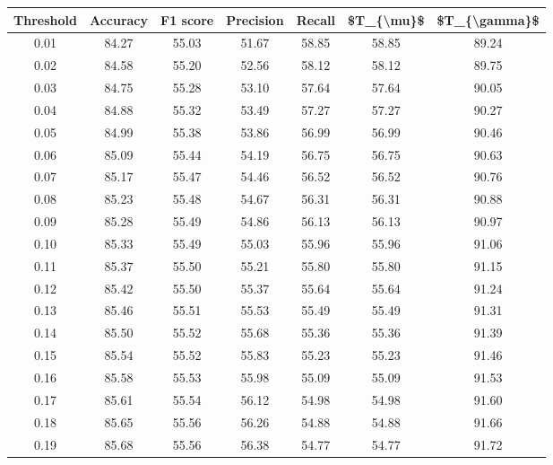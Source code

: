 \begin{tabular}{|c|c|c|c|c|c|c|}
\hline
 Threshold &  Accuracy &  F1 score &  Precision &  Recall &  \$T\_\{\textbackslash mu\}\$ &  \$T\_\{\textbackslash gamma\}\$ \\
\hline
      0.01 &     84.27 &     55.03 &      51.67 &   58.85 &      58.85 &         89.24 \\
      0.02 &     84.58 &     55.20 &      52.56 &   58.12 &      58.12 &         89.75 \\
      0.03 &     84.75 &     55.28 &      53.10 &   57.64 &      57.64 &         90.05 \\
      0.04 &     84.88 &     55.32 &      53.49 &   57.27 &      57.27 &         90.27 \\
      0.05 &     84.99 &     55.38 &      53.86 &   56.99 &      56.99 &         90.46 \\
      0.06 &     85.09 &     55.44 &      54.19 &   56.75 &      56.75 &         90.63 \\
      0.07 &     85.17 &     55.47 &      54.46 &   56.52 &      56.52 &         90.76 \\
      0.08 &     85.23 &     55.48 &      54.67 &   56.31 &      56.31 &         90.88 \\
      0.09 &     85.28 &     55.49 &      54.86 &   56.13 &      56.13 &         90.97 \\
      0.10 &     85.33 &     55.49 &      55.03 &   55.96 &      55.96 &         91.06 \\
      0.11 &     85.37 &     55.50 &      55.21 &   55.80 &      55.80 &         91.15 \\
      0.12 &     85.42 &     55.50 &      55.37 &   55.64 &      55.64 &         91.24 \\
      0.13 &     85.46 &     55.51 &      55.53 &   55.49 &      55.49 &         91.31 \\
      0.14 &     85.50 &     55.52 &      55.68 &   55.36 &      55.36 &         91.39 \\
      0.15 &     85.54 &     55.52 &      55.83 &   55.23 &      55.23 &         91.46 \\
      0.16 &     85.58 &     55.53 &      55.98 &   55.09 &      55.09 &         91.53 \\
      0.17 &     85.61 &     55.54 &      56.12 &   54.98 &      54.98 &         91.60 \\
      0.18 &     85.65 &     55.56 &      56.26 &   54.88 &      54.88 &         91.66 \\
      0.19 &     85.68 &     55.56 &      56.38 &   54.77 &      54.77 &         91.72 \\

\end{tabular}
